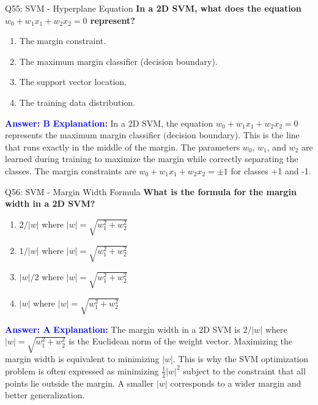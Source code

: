 \documentclass[8pt]{beamer}
\begin{document}
	\begin{frame}{Q55: SVM - Hyperplane Equation}
		\fontsize{6.5}{7.5}\selectfont
		\textbf{In a 2D SVM, what does the equation $w_0 + w_1 x_1 + w_2 x_2 = 0$ represent?}
		\begin{enumerate}
			\item The margin constraint.
			\item The maximum margin classifier (decision boundary).
			\item The support vector location.
			\item The training data distribution.
		\end{enumerate}
		\vspace{0.1cm}
		\textcolor{blue}{\textbf{Answer: B}}
		\vspace{0.1cm}
		\textcolor{blue}{\textbf{Explanation:}} In a 2D SVM, the equation $w_0 + w_1 x_1 + w_2 x_2 = 0$ represents the maximum margin classifier (decision boundary). This is the line that runs exactly in the middle of the margin. The parameters $w_0$, $w_1$, and $w_2$ are learned during training to maximize the margin while correctly separating the classes. The margin constraints are $w_0 + w_1 x_1 + w_2 x_2 = \pm 1$ for classes +1 and -1.
	\end{frame}
	
	\begin{frame}{Q56: SVM - Margin Width Formula}
		\fontsize{6.5}{7.5}\selectfont
		\textbf{What is the formula for the margin width in a 2D SVM?}
		\begin{enumerate}
			\item $2/|w|$ where $|w| = \sqrt{w_1^2 + w_2^2}$
			\item $1/|w|$ where $|w| = \sqrt{w_1^2 + w_2^2}$
			\item $|w|/2$ where $|w| = \sqrt{w_1^2 + w_2^2}$
			\item $|w|$ where $|w| = \sqrt{w_1^2 + w_2^2}$
		\end{enumerate}
		\vspace{0.1cm}
		\textcolor{blue}{\textbf{Answer: A}}
		\vspace{0.1cm}
		\textcolor{blue}{\textbf{Explanation:}} The margin width in a 2D SVM is $2/|w|$ where $|w| = \sqrt{w_1^2 + w_2^2}$ is the Euclidean norm of the weight vector. Maximizing the margin width is equivalent to minimizing $|w|$. This is why the SVM optimization problem is often expressed as minimizing $\frac{1}{2}|w|^2$ subject to the constraint that all points lie outside the margin. A smaller $|w|$ corresponds to a wider margin and better generalization.
	\end{frame}
	
\end{document}
